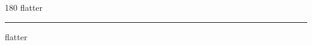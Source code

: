 
\begin{frame}
\begin{center}
\begin{turn}{180}
{\fontsize{2.5cm}{1em}\selectfont flatter}
\end{turn}
\vspace{1em}\par  
\hrule
\vspace{1em}\par  
{\fontsize{2.5cm}{1em}\selectfont flatter}
\end{center}
\end{frame}
